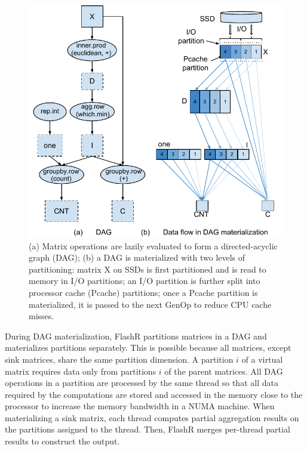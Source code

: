 \begin{figure}
	\centering
	\includegraphics[scale=0.6]{FlashMatrix_figs/kmeans.pdf}
  \vspace{-4pt}
	\caption{(a) Matrix operations are lazily evaluated to form
	a directed-acyclic graph (DAG); (b) a DAG is materialized with
	two levels of partitioning: matrix X on SSDs is first partitioned
	and is read to memory in I/O partitions; an I/O partition is further
	split into processor cache (Pcache) partitions; once a Pcache partition
	is materialized, it is passed to the next GenOp to reduce CPU cache misses. }
	\label{fig:dag}
  \vspace{-8pt}
\end{figure}

During DAG materialization, FlashR partitions matrices in a DAG and
materializes partitions separately.
This is possible because all matrices, except
sink matrices, share the same partition dimension. 
A partition $i$ of a virtual matrix requires data only from partitions
$i$ of the parent matrices.  All DAG operations in a partition are processed by 
the same thread so that all data required by the computations are stored and
accessed in the memory close to the processor to increase the memory bandwidth
in a NUMA machine.
When materializing a sink matrix, each thread computes partial
aggregation results on the partitions assigned to the thread. 
Then, FlashR merges per-thread partial results to construct the output.

